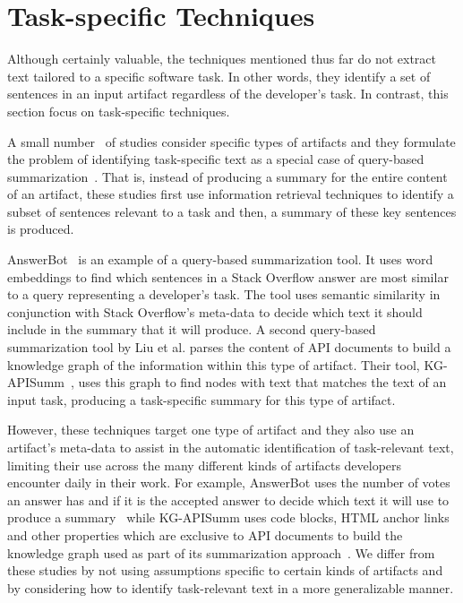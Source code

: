 



\section{Task-specific Techniques}
\label{cp2:task-approaches}



Although certainly valuable, the techniques mentioned thus far
do not extract text tailored to 
a specific software task. In other words, they identify 
a set of sentences in an input artifact regardless of the developer's task. 
In contrast, this section focus on task-specific techniques.

A small number~\cite{Xu2017, silva2019, liu2019qapi} of studies consider specific types of artifacts and
they formulate the problem of identifying task-specific text as 
a special case of query-based summarization~\cite{Goldsteinet1999}. That is, 
instead of producing a summary for the entire content of 
an artifact,
these studies first use information retrieval techniques
to identify a subset 
of sentences relevant to a task and then, 
a summary of these key sentences is produced.



AnswerBot~\cite{Xu2017} is an example of a query-based summarization tool.
It uses word embeddings to find which sentences in a Stack Overflow answer 
are most similar to a query representing a developer's task.
The tool uses semantic similarity in conjunction with 
Stack Overflow's meta-data to decide which text  it should include
in the summary that it will produce. 
A second query-based summarization tool by Liu et al. parses the content 
of API documents to build a knowledge graph of the information within this type of artifact. 
Their tool, KG-APISumm~\cite{liu2019qapi}, uses this graph 
to find nodes with text that matches the text of an input task, 
producing a task-specific summary for this type of artifact. 


However, these techniques
target one type of artifact and they also use an artifact's meta-data to 
assist in the automatic identification of task-relevant text, 
limiting their use across the
many different kinds of artifacts developers encounter
daily in their work. 
For example, AnswerBot uses the number of votes an answer has and if it is the accepted answer to decide which text it will use to produce a summary~\cite{Xu2017}
while KG-APISumm uses 
code blocks, HTML anchor links and other properties which are exclusive to API documents to build the knowledge graph used as part of its summarization approach~\cite{liu2019qapi}.
We differ from these studies 
by not using assumptions 
specific to certain kinds of artifacts
and by considering how to identify task-relevant text 
in a more generalizable manner.





